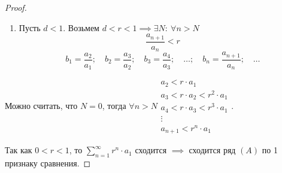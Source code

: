 \documentclass{report}
\theoremstyle{definition}
\begin{document}
\begin{proof}
  \begin{enumerate}
    \item Пусть $d < 1$. Возьмем $d < r < 1 \implies \exists N: \ \forall n > N$
          \begin{equation*}
            \frac{a_{n+1}}{a_n}<r
          \end{equation*}
          \begin{equation*}
            b_1 = \frac{a_2}{a_1}; \quad b_2 = \frac{a_3}{a_2}; \quad b_3 = \frac{a_4}{a_3}; \quad \ldots; \quad b_n = \frac{a_{n+1}}{a_n}; \quad \ldots
          \end{equation*}
  \end{enumerate}

  Можно считать, что $N=0$, тогда $\forall n > N \begin{array}{l}
      a_2 < r \cdot a_1                 \\
      a_3 < r \cdot a_2 < r^2 \cdot a_1 \\
      a_4 < r \cdot a_3 < r^3 \cdot a_1 \\
      \vdots                            \\
      a_{n+1} < r^n \cdot a_1
    \end{array}$.

  Так как $0 < r < 1$, то $\sum_{n=1}^{\infty} r^n \cdot a_1$ сходится $\implies$ сходится ряд $(A)$ по 1 признаку сравнения.
\end{proof}
\end{document}
